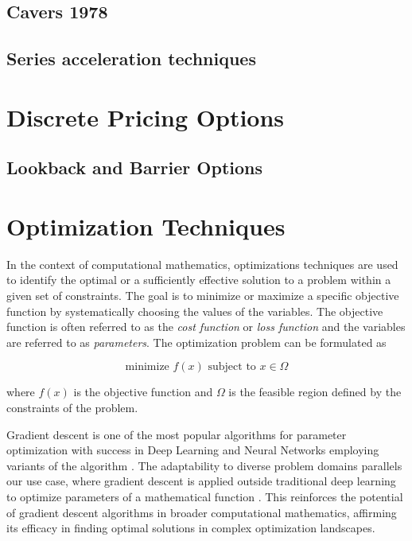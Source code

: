 \documentclass[a4paper]{report}
\begin{document}
\subsection{Cavers 1978}

\subsection{Series acceleration techniques}

\section{Discrete Pricing Options}

\subsection{Lookback and Barrier Options}

\section{Optimization Techniques}
In the context of computational mathematics, optimizations techniques are used to identify the optimal or a sufficiently effective solution to a problem within a given set of constraints. The goal is to minimize or maximize a specific objective function by systematically choosing the values of the variables. The objective function is often referred to as the \textit{cost function} or \textit{loss function} and the variables are referred to as \textit{parameters}. The optimization problem can be formulated as

\begin{equation}\label{optimization_problem}
	\text{minimize } f(x) \text{ subject to } x \in \Omega
\end{equation}

where $f(x)$ is the objective function and $\Omega$ is the feasible region defined by the constraints of the problem.

Gradient descent is one of the most popular algorithms for parameter optimization with success in Deep Learning and Neural Networks employing variants of the algorithm \citep{lu2017improved, zhang2019gradient, zeebaree2019trainable}. The adaptability to diverse problem domains \citep{YingjieYugiHaibin2023SGD} parallels our use case, where gradient descent is applied outside traditional deep learning to optimize parameters of a mathematical function \citep{GradientBasedOpt2022}. This reinforces the potential of gradient descent algorithms in broader computational mathematics, affirming its efficacy in finding optimal solutions in complex optimization landscapes.
\end{document}
